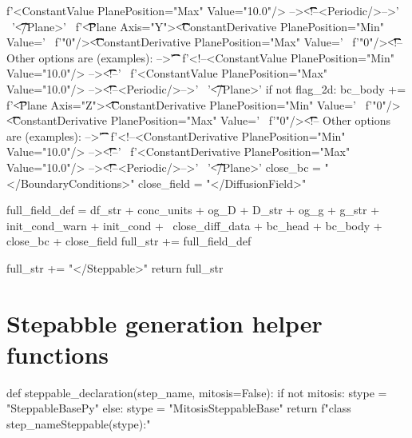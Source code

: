 \begin{python}
              f'<ConstantValue PlanePosition="Max" Value="10.0"/> -->\n\t\t\t\t\t<!--<Periodic/>-->' \
              '\t\t\t\t</Plane>\n' \
              f'\t\t\t\t<Plane Axis="Y">\n\t\t\t\t\t<ConstantDerivative PlanePosition="Min" Value=' \
              f'"0"/>\n\t\t\t\t\t<ConstantDerivative PlanePosition="Max" Value=' \
              f'"0"/>\n\t\t\t\t\t<!-- Other options are (examples): -->\n\t\t\t\t\t' \
              f'<!--<ConstantValue PlanePosition="Min" Value="10.0"/> -->\n\t\t\t\t\t<!--' \
              f'<ConstantValue PlanePosition="Max" Value="10.0"/> -->\n\t\t\t\t\t<!--<Periodic/>-->' \
              '\t\t\t\t</Plane>\n'
            if not flag_2d:
                bc_body += f'\t\t\t\t<Plane Axis="Z">\n\t\t\t\t\t<ConstantDerivative PlanePosition="Min" Value=' \
                   f'"0"/>\n\t\t\t\t\t<ConstantDerivative PlanePosition="Max" Value=' \
                   f'"0"/>\n\t\t\t\t\t<!-- Other options are (examples): -->\n\t\t\t\t\t' \
                   f'<!--<ConstantDerivative PlanePosition="Min" Value="10.0"/> -->\n\t\t\t\t\t<!--' \
                   f'<ConstantDerivative PlanePosition="Max" Value="10.0"/> -->\n\t\t\t\t\t<!--<Periodic/>-->' \
                           '\t\t\t\t</Plane>\n'
        close_bc = "</BoundaryConditions>\n"
        close_field = "</DiffusionField>\n"

        full_field_def = df_str + conc_units + og_D + D_str + og_g + g_str + init_cond_warn + init_cond + \
                         close_diff_data + bc_head + bc_body + close_bc + close_field
        full_str += full_field_def

    full_str += "</Steppable>\n"
    return full_str
\end{python}


\section{Stepabble generation helper functions}\label{code:trans:cc3d:step-gen-general}

\begin{python}
def steppable_declaration(step_name, mitosis=False):
    if not mitosis:
        stype = "SteppableBasePy"
    else:
        stype = "MitosisSteppableBase"
    return f"class {step_name}Steppable({stype}):\n"    
\end{python}

